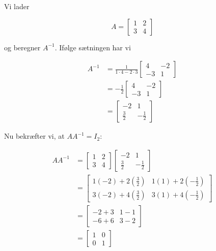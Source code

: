 \begin{example} Vi lader

\[
A=\left[\begin{array}{ll}
1 & 2 \\
3 & 4
\end{array}\right]
\]

og beregner $A^{-1}$. Ifølge sætningen har vi

\[
\begin{aligned}
A^{-1} & =\frac{1}{1 \cdot 4-2 \cdot 3}\left[\begin{array}{cc}
4 & -2 \\
-3 & 1
\end{array}\right] \\
& =-\frac{1}{2}\left[\begin{array}{cc}
4 & -2 \\
-3 & 1
\end{array}\right] \\
& =\left[\begin{array}{cc}
-2 & 1 \\
\frac{3}{2} & -\frac{1}{2}
\end{array}\right]
\end{aligned}
\]

Nu bekræfter vi, at $A A^{-1}=I_2$:

\[
\begin{aligned}
A A^{-1} & =\left[\begin{array}{ll}
1 & 2 \\
3 & 4
\end{array}\right]\left[\begin{array}{cc}
-2 & 1 \\
\frac{3}{2} & -\frac{1}{2}
\end{array}\right] \\
& =\left[\begin{array}{ll}
1(-2)+2\left(\frac{3}{2}\right) & 1(1)+2\left(-\frac{1}{2}\right) \\
3(-2)+4\left(\frac{3}{2}\right) & 3(1)+4\left(-\frac{1}{2}\right)
\end{array}\right] \\
& =\left[\begin{array}{ll}
-2+3 & 1-1 \\
-6+6 & 3-2
\end{array}\right] \\
& =\left[\begin{array}{ll}
1 & 0 \\
0 & 1
\end{array}\right]
\end{aligned}
\]
\label{ex:inverse}
\end{example}

